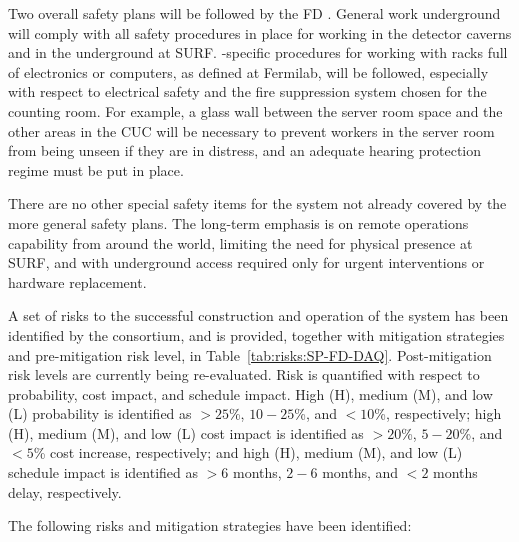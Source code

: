 Two overall safety plans will be followed by the FD . General work underground will comply
with all safety procedures in place for working in the detector
caverns and in the  underground at
SURF. -specific procedures for working with racks full of
electronics or computers, as defined 
at Fermilab, will be followed, especially with respect to electrical safety and the fire suppression
system chosen for the counting room. For example, a glass wall between the server room space and
the other areas in the CUC will be necessary to prevent workers in the server room from being
unseen if they are in distress, and an adequate hearing protection
regime must be put in place.

There are no other special safety items for the  system not already covered by the more general safety plans. The long-term emphasis is on remote operations capability from around the world, limiting the need for physical presence at SURF, and with underground access required only for urgent interventions or hardware replacement. 

A set of risks to the successful construction and operation of the  system has been
identified by the consortium, and is provided,
together with mitigation strategies and pre-mitigation risk level, 
in Table~\ref{tab:risks:SP-FD-DAQ}. Post-mitigation risk levels are
currently being re-evaluated. Risk is quantified with respect to
probability, cost impact, and schedule impact. High (H), medium (M), and low (L)
probability is identified as
$>25$\%, $10-25$\%, and $<10$\%, respectively; high (H), medium (M), and low (L)
cost impact is identified as
$>20$\%, $5-20$\%, and $<5$\% cost increase, respectively; and high
(H), medium (M), and low (L) schedule impact is identified as 
$>6$ months, $2-6$ months, and $<2$ months delay, respectively.

%

The following risks and mitigation strategies have been identified:

